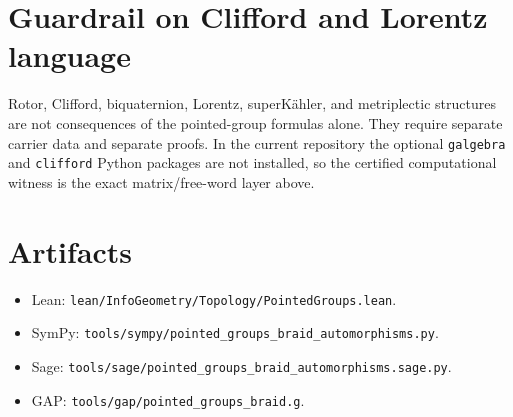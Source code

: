 \documentclass{article}
\begin{document}
\section{Guardrail on Clifford and Lorentz language}
Rotor, Clifford, biquaternion, Lorentz, superKähler, and metriplectic structures
are not consequences of the pointed-group formulas alone.  They require separate
carrier data and separate proofs.  In the current repository the optional
\texttt{galgebra} and \texttt{clifford} Python packages are not installed, so the
certified computational witness is the exact matrix/free-word layer above.

\section{Artifacts}
\begin{itemize}
  \item Lean: \texttt{lean/InfoGeometry/Topology/PointedGroups.lean}.
  \item SymPy: \texttt{tools/sympy/pointed\_groups\_braid\_automorphisms.py}.
  \item Sage: \texttt{tools/sage/pointed\_groups\_braid\_automorphisms.sage.py}.
  \item GAP: \texttt{tools/gap/pointed\_groups\_braid.g}.
\end{itemize}
\end{document}
